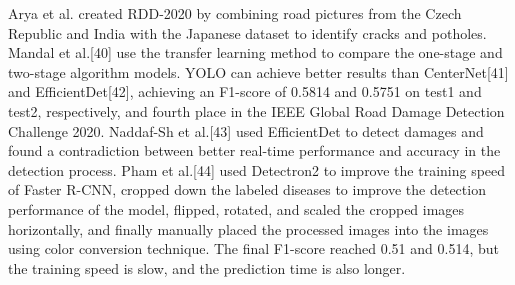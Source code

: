 \documentclass[sensors,article,submit,moreauthors]{Definitions/mdpi}
\begin{document}

    Arya et al.\citep{arya2021rdd2020} created RDD-2020 by combining road pictures from the Czech Republic and India with the Japanese dataset to identify cracks and potholes. Mandal et al.[40]\citep{Mandal2020deep} use the transfer learning method to compare the one-stage and two-stage algorithm models. YOLO can achieve better results than CenterNet[41]\citep{Duan_2019_ICCV} and EfficientDet[42]\citep{Tan_2020_CVPR}, achieving an F1-score of 0.5814 and 0.5751 on test1 and test2, respectively, and fourth place in the IEEE Global Road Damage Detection Challenge 2020. Naddaf-Sh et al.[43]\citep{Naddaf-Sh2020efficient} used EfficientDet to detect damages and found a contradiction between better real-time performance and accuracy in the detection process. Pham et al.[44]\citep{pham2020road} used Detectron2 to improve the training speed of Faster R-CNN, cropped down the labeled diseases to improve the detection performance of the model, flipped, rotated, and scaled the cropped images horizontally, and finally manually placed the processed images into the images using color conversion technique. The final F1-score reached 0.51 and 0.514, but the training speed is slow, and the prediction time is also longer.
\end{document}
